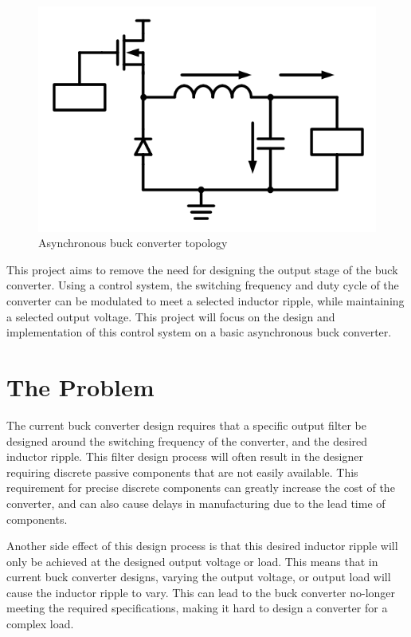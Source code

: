 \documentclass[11pt, a4paper, twoside, openright]{report}
\begin{document}
\begin{figure}[h!]
  \begin{center}
    \includegraphics[width=0.6\linewidth]{asynchronous_buck.png} 
    \caption{Asynchronous buck converter topology \cite{BuckTopology}}
    \label{asynchronous_buck}
  \end{center}
\end{figure} 

This project aims to remove the need for designing the output stage of the buck converter. Using a control system, the switching frequency and duty cycle of the converter can be modulated to meet a selected inductor ripple, while maintaining a selected output voltage. This project will focus on the design and implementation of this control system on a basic asynchronous buck converter.  
\newpage

\section{The Problem}

The current buck converter design requires that a specific output filter be designed around the switching frequency of the converter, and the desired inductor ripple. This filter design process will often result in the designer requiring discrete passive components that are not easily available. This requirement for precise discrete components can greatly increase the cost of the converter, and can also cause delays in manufacturing due to the lead time of components.

Another side effect of this design process is that this desired inductor ripple will only be achieved at the designed output voltage or load. This means that in current buck converter designs, varying the output voltage, or output load will cause the inductor ripple to vary. This can lead to the buck converter no-longer meeting the required specifications, making it hard to design a converter for a complex load.
\end{document}
